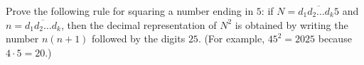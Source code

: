Prove the following rule for squaring a number ending in $5$: if $N=\overline{d_1d_2\ldots d_k5}$ and $n=\overline{d_1d_2\ldots d_k}$, then the decimal representation of $N^2$ is obtained by writing the number $n(n+1)$ followed by the digits $25$. (For example, $45^2=2025$ because $4\cdot5=20$.)
